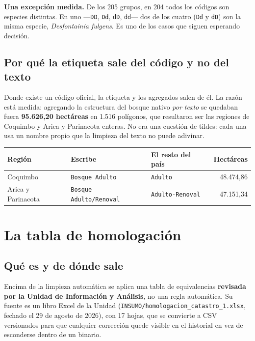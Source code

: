 \documentclass[11pt,a4paper]{report}
\newcommand{\campo}[1]{\textcolor{conaf}{\textbf{#1}}}
\newcommand{\orig}[1]{\texttt{\small #1}}
\begin{document}
\begin{nota}
\campo{Una excepción medida.} De los 205 grupos, en 204 todos los códigos son
especies distintas. En uno —\orig{DD}, \orig{Dd}, \orig{dD}, \orig{dd}— dos de
los cuatro (\orig{Dd} y \orig{dD}) son la misma especie, \emph{Desfontainia
fulgens}. Es uno de los casos que siguen esperando decisión.
\end{nota}

\section{Por qué la etiqueta sale del código y no del texto}

Donde existe un código oficial, la etiqueta y los agregados salen de él. La
razón está medida: agregando la estructura del bosque nativo \emph{por texto} se
quedaban fuera \textbf{95.626,20 hectáreas} en 1.516 polígonos, que resultaron
ser las regiones de Coquimbo y Arica y Parinacota enteras. No era una cuestión
de tildes: cada una usa un nombre propio que la limpieza del texto no puede
adivinar.

\begin{center}
\begin{tabular}{@{}L{3.7cm} L{4.1cm} L{2.9cm} r@{}}
\toprule
\textbf{Región} & \textbf{Escribe} & \textbf{El resto del país} & \textbf{Hectáreas}\\
\midrule
Coquimbo & \orig{Bosque Adulto} & \orig{Adulto} & 48.474,86\\
Arica y Parinacota & \orig{Bosque Adulto/Renoval} & \orig{Adulto-Renoval} & 47.151,34\\
\bottomrule
\end{tabular}
\end{center}

\chapter{La tabla de homologación}

\section{Qué es y de dónde sale}

Encima de la limpieza automática se aplica una tabla de equivalencias
\campo{revisada por la Unidad de Información y Análisis}, no una regla
automática. Su fuente es un libro Excel de la Unidad
(\orig{INSUMO/homologacion\_catastro\_1.xlsx}, fechado el 29 de agosto de 2026),
con 17 hojas, que se convierte a CSV versionados para que cualquier corrección
quede visible en el historial en vez de esconderse dentro de un binario.
\end{document}

